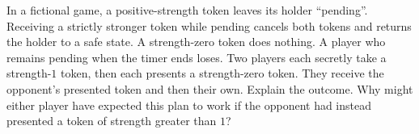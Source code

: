 In a fictional game, a positive-strength token leaves its holder ``pending''. Receiving a strictly stronger token while pending cancels both tokens and returns the holder to a safe state. A strength-zero token does nothing. A player who remains pending when the timer ends loses.
Two players each secretly take a strength-$1$ token, then each presents a strength-zero token. They receive the opponent's presented token and then their own. Explain the outcome. Why might either player have expected this plan to work if the opponent had instead presented a token of strength greater than $1$?

